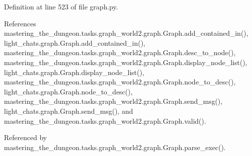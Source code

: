 Definition at line 523 of file graph.\+py.



References mastering\+\_\+the\+\_\+dungeon.\+tasks.\+graph\+\_\+world2.\+graph.\+Graph.\+add\+\_\+contained\+\_\+in(), light\+\_\+chats.\+graph.\+Graph.\+add\+\_\+contained\+\_\+in(), mastering\+\_\+the\+\_\+dungeon.\+tasks.\+graph\+\_\+world2.\+graph.\+Graph.\+desc\+\_\+to\+\_\+node(), mastering\+\_\+the\+\_\+dungeon.\+tasks.\+graph\+\_\+world2.\+graph.\+Graph.\+display\+\_\+node\+\_\+list(), light\+\_\+chats.\+graph.\+Graph.\+display\+\_\+node\+\_\+list(), mastering\+\_\+the\+\_\+dungeon.\+tasks.\+graph\+\_\+world2.\+graph.\+Graph.\+node\+\_\+to\+\_\+desc(), light\+\_\+chats.\+graph.\+Graph.\+node\+\_\+to\+\_\+desc(), mastering\+\_\+the\+\_\+dungeon.\+tasks.\+graph\+\_\+world2.\+graph.\+Graph.\+send\+\_\+msg(), light\+\_\+chats.\+graph.\+Graph.\+send\+\_\+msg(), and mastering\+\_\+the\+\_\+dungeon.\+tasks.\+graph\+\_\+world2.\+graph.\+Graph.\+valid().



Referenced by mastering\+\_\+the\+\_\+dungeon.\+tasks.\+graph\+\_\+world2.\+graph.\+Graph.\+parse\+\_\+exec().

